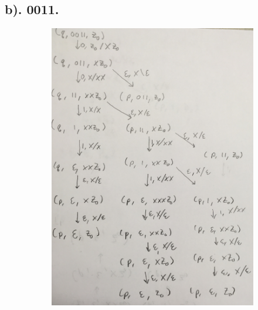 \documentclass[20pt]{article} %
\begin{document}
\subsection{b). 0011.}
\begin{figure}[!htbp]
  	\centering
   	\begin{subfigure}[p]{0.8\linewidth}
    	\includegraphics[width=\linewidth]{./figures/h7-2.jpg}
   	\end{subfigure}
\end{figure} 
\newpage
\end{document}
